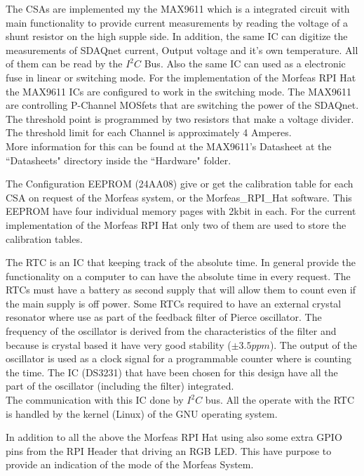 The CSAs are implemented my the MAX9611 which is a integrated circuit with main functionality to provide current measurements by reading the voltage of a shunt resistor on the high supple side.
In addition, the same IC can digitize the measurements of SDAQnet current, Output voltage and it's own temperature. All of them can be read by the $I^2C$ Bus.
Also the same IC can used as a electronic fuse in linear or switching mode. For the implementation of the Morfeas RPI Hat the MAX9611 ICs are configured to work in the switching mode.
The MAX9611 are controlling P-Channel MOSfets that are switching the power of the SDAQnet.
The threshold point is programmed by two resistors that make a voltage divider. The threshold limit for each Channel is approximately 4 Amperes.\\
More information for this can be found at the MAX9611's Datasheet at the ``Datasheets" directory inside the ``Hardware" folder.

The Configuration EEPROM (24AA08) give or get the calibration table for each CSA on request of the Morfeas system, or the Morfeas\_RPI\_Hat software.
This EEPROM have four individual memory pages with 2kbit in each.
For the current implementation of the Morfeas RPI Hat only two of them are used to store the calibration tables.

The RTC is an IC that keeping track of the absolute time. In general provide the functionality on a computer to can have the absolute time in every request.
The RTCs must have a battery as second supply that will allow them to count even if the main supply is off power.
Some RTCs required to have an external crystal resonator where use as part of the feedback filter of Pierce oscillator.
The frequency of the oscillator is derived from the characteristics of the filter and because is crystal based it have very good stability ($\pm3.5ppm$).
The output of the oscillator is used as a clock signal for a programmable counter where is counting the time. The IC (DS3231) that have been chosen for this design have all the part of the oscillator (including the filter) integrated.\\
The communication with this IC done by $I^2C$ bus. All the operate with the RTC is handled by the kernel (Linux) of the GNU operating system.

In addition to all the above the Morfeas RPI Hat using also some extra GPIO pins from the RPI Header that driving an RGB LED.
This have purpose to provide an indication of the mode of the Morfeas System.


